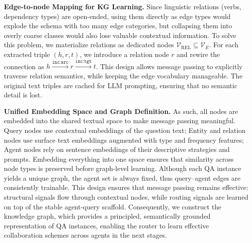 \documentclass[11pt]{article}
\begin{document}
\noindent\textbf{Edge-to-node Mapping for KG Learning.}  
Since linguistic relations (verbs, dependency types) are open-ended, using them directly as edge types would explode the schema with too many edge categories, but collapsing them into overly coarse classes would also lose valuable contextual information. To solve this problem, we materialize relations as dedicated nodes $\mathcal{V}_{\text{REL}} \subseteq \mathcal{V}_E$. For each extracted triple $(h,r,t)$, we introduce a relation node $r$ and rewire the connection as $h \xrightarrow{\texttt{inc:src}} r \xrightarrow{\texttt{inc:tgt}} t$. This design allows message passing to explicitly traverse relation semantics, while keeping the edge vocabulary manageable. The original text triples are cached for LLM prompting, ensuring that no semantic detail is lost.

\noindent\textbf{Unified Embedding Space and Graph Definition.}  
As such, all nodes are embedded into the shared textual space to make message passing meaningful. Query nodes use contextual embeddings of the question text; Entity and relation nodes use surface text embeddings augmented with type and frequency features; Agent nodes rely on sentence embeddings of their descriptive strategies and prompts. Embedding everything into one space ensures that similarity across node types is preserved before graph-level learning. Although each QA instance yields a unique graph, the agent set is always fixed, thus query–agent edges are consistently trainable. This design ensures that message passing remains effective: structural signals flow through contextual nodes, while routing signals are learned on top of the stable agent-query scaffold. Consequently, we construct the knowledge graph, which provides a principled, semantically grounded representation of QA instances, enabling the router to learn effective collaboration schemes across agents in the next stages.
\end{document}
